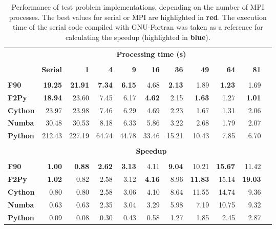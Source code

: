 \documentclass[12pt]{article}
\newcommand{\red}[1]{\textbf{\color{red}#1}}
\newcommand{\blue}[1]{\textbf{\color{blue}#1}}
\begin{document}
\begin{table}
\footnotesize
\centering
\caption{Performance of test problem implementations, depending on the number of MPI processes. The best values for serial or MPI are highlighted in \red{red}. The execution time of the serial code compiled with GNU-Fortran was taken as a reference for calculating the speedup (highlighted in \blue{blue}).}
\label{tab:impl}
\begin{tabular}{lrrrrrrrrrr}
\toprule
&\multicolumn{9}{c}{\textbf{Processing time (s)}} \\
\cline{2-10}\vspace{-9pt} & & & & & & & & & \\
&\textbf{Serial} &\textbf{1} &\textbf{4} &\textbf{9} &\textbf{16} &\textbf{36} &\textbf{49} &\textbf{64} &\textbf{81} \\
\hline\vspace{-9pt} & & & & & & & & & \\
\textbf{F90} &\blue{19.25} &\red{21.91} &\red{7.34} &\red{6.15} &4.68 &\red{2.13} &1.89 &\red{1.23} &1.69 \\
\textbf{F2Py} &\red{18.94} &23.60 &7.45 &6.17 &\red{4.62} &2.15 &\red{1.63} &1.27 &\red{1.01} \\
\textbf{Cython} &23.97 &23.98 &7.46 &6.29 &4.69 &2.23 &1.67 &1.31 &2.06 \\
\textbf{Numba} &30.48 &30.53 &8.18 &6.33 &5.86 &3.22 &2.68 &1.79 &2.07 \\
\textbf{Python} &212.43 &227.19 &64.74 &44.78 &33.46 &15.21 &10.43 &7.85 &6.70 \\
\hline\vspace{-9pt} & & & & & & & & & \\
&\multicolumn{9}{c}{\textbf{Speedup}} \\
\hline\vspace{-9pt} & & & & & & & & & \\
\textbf{F90} &\blue{1.00} &\red{0.88} &\red{2.62} &\red{3.13} &4.11 &\red{9.04} &10.21 &\red{15.67} &11.42 \\
\textbf{F2Py} &\red{1.02} &0.82 &2.58 &3.12 &\red{4.16} &8.96 &\red{11.83} &15.14 &\red{19.03} \\
\textbf{Cython} &0.80 &0.80 &2.58 &3.06 &4.10 &8.64 &11.55 &14.74 &9.36 \\
\textbf{Numba} &0.63 &0.63 &2.35 &3.04 &3.29 &5.98 &7.19 &10.75 &9.32 \\
\textbf{Python} &0.09 &0.08 &0.30 &0.43 &0.58 &1.27 &1.85 &2.45 &2.87 \\

\end{tabular}
\end{table}
\end{document}
